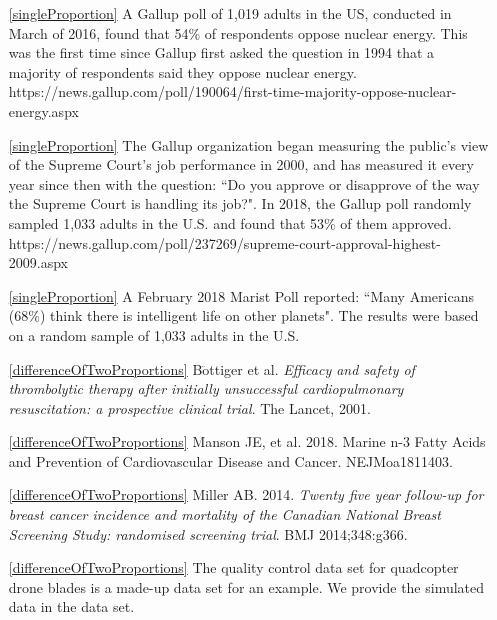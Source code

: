 
\begin{itemize}
\item[\ref{singleProportion}]
    A Gallup poll of 1,019 adults in the US, conducted in March of 2016, found that 54\% of respondents oppose nuclear energy.  This was the first time since Gallup first asked the question in 1994 that a majority of respondents said they oppose nuclear energy.\\
        {https://news.gallup.com/poll/190064/first-time-majority-oppose-nuclear-energy.aspx}

\item[\ref{singleProportion}]
    The Gallup organization began measuring the public's view of the Supreme Court's job performance in 2000, and has measured it every year since then with the question: ``Do you approve or disapprove of the way the Supreme Court is handling its job?".  In 2018, the Gallup poll randomly sampled 1,033 adults in the U.S. and found that 53\% of them approved. \\   
        {https://news.gallup.com/poll/237269/supreme-court-approval-highest-2009.aspx}

\item[\ref{singleProportion}]
    A February 2018 Marist Poll reported: ``Many Americans (68\%) think there is intelligent life on other planets".  The results were based on a random sample of 1,033 adults in the U.S. \\


\item[\ref{differenceOfTwoProportions}]
    B$\ddot{\text{o}}$ttiger et al.
    \emph{Efficacy and safety of thrombolytic therapy after
        initially unsuccessful cardiopulmonary resuscitation:
        a prospective clinical trial}.
        The Lancet, 2001.
\item[\ref{differenceOfTwoProportions}]
    Manson JE, et al. 2018.
    Marine n-3 Fatty Acids and Prevention of
    Cardiovascular Disease and Cancer. NEJMoa1811403.
\item[\ref{differenceOfTwoProportions}]
        {Miller AB. 2014.
            \emph{Twenty five year follow-up for breast cancer
            incidence and mortality of the Canadian National
            Breast Screening Study: randomised screening trial}.
            BMJ 2014;348:g366.}
\item[\ref{differenceOfTwoProportions}]
    The quality control data set for quadcopter drone blades
    is a made-up data set for an example.
    We provide the simulated data in the
     data set.


\end{itemize}
